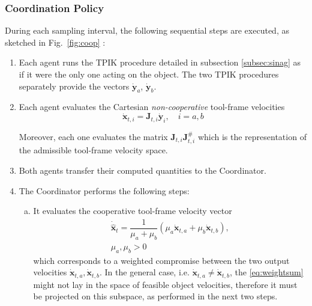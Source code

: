 \documentclass[a4paper, 12pt, notitlepage]{article}
\begin{document}
\begin{multicols}{2}
		\subsubsection{Coordination Policy}
		
		\hspace{7px} During each sampling interval, the following sequential steps are executed, as sketched in Fig.\ \ref{fig:coop} :
		
		\begin{enumerate}[leftmargin=*]
			
			\item Each agent runs the TPIK procedure detailed in subsection \ref{subsec:sinag} as if it were the only one acting on the object. The two TPIK procedures separately provide the vectors $\dot{\boldsymbol{y}}_a$, $\dot{\boldsymbol{y}}_b$.
			
			\item Each agent evaluates the Cartesian \textit{non-cooperative} tool-frame velocities
			\begin{equation}
				\dot{\boldsymbol{x}}_{t,i} = \boldsymbol{J}_{t,i} \dot{\boldsymbol{y}}_i , \quad i = a,b
			\end{equation}
			
			Moreover, each one evaluates the matrix $\boldsymbol{J}_{t,i} \boldsymbol{J}^\#_{t,i}$
			which is the representation of the admissible tool-frame velocity space.
			
			\item Both agents transfer their computed quantities to the Coordinator.
			
			\item The Coordinator performs the following steps:
			
			\begin{enumerate}[a), leftmargin=*]
				\item It evaluates the cooperative tool-frame velocity vector
				\begin{equation}\label{eq:weightsum}
					\begin{gathered}
					\dot{\hat{\boldsymbol{x}}}_t = \dfrac{1}{\mu_a + \mu_b} (\mu_a \dot{\boldsymbol{x}}_{t,a}  + \mu_b \dot{\boldsymbol{x}}_{t,b}),\\
					\mu_a , \mu_b > 0	
					\end{gathered}
				\end{equation}
				which corresponds to a weighted compromise between
				the two output velocities $\dot{\boldsymbol{x}}_{t,a} , \dot{\boldsymbol{x}}_{t,b}$.
				In the general case, i.e. $\dot{\boldsymbol{x}}_{t,a} \neq \dot{\boldsymbol{x}}_{t,b}$, the \eqref{eq:weightsum} might not lay in the space of feasible object velocities, therefore it must be projected on this subspace, as performed in the next two steps. 
				

\end{enumerate}
\end{enumerate}
\end{multicols}
\end{document}
